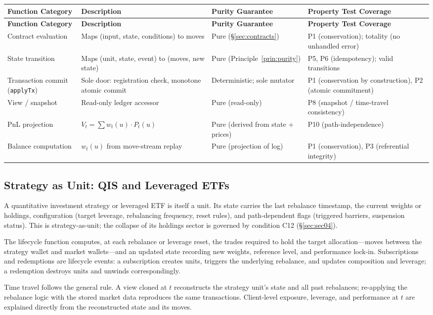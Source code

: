\begin{center}
\begin{longtable}{p{3.2cm} p{4cm} p{2.8cm} p{3.5cm}}
\toprule
\textbf{Function Category} & \textbf{Description} & \textbf{Purity Guarantee} & \textbf{Property Test Coverage} \\
\midrule
\endfirsthead
\toprule
\textbf{Function Category} & \textbf{Description} & \textbf{Purity Guarantee} & \textbf{Property Test Coverage} \\
\midrule
\endhead
Contract evaluation & Maps (input, state, conditions) to moves & Pure (\S\ref{sec:contracts}) & P1 (conservation); totality (no unhandled error) \\
\midrule
State transition & Maps (unit, state, event) to (moves, new state) & Pure (Principle~\ref{prin:purity}) & P5, P6 (idempotency); valid transitions \\
\midrule
Transaction commit (\texttt{applyTx}) & Sole door: registration check, monotone atomic commit & Deterministic; sole mutator & P1 (conservation by construction), P2 (atomic commitment) \\
\midrule
View / snapshot & Read-only ledger accessor & Pure (read-only) & P8 (snapshot / time-travel consistency) \\
\midrule
PnL projection & $V_t = \sum w_t(u) \cdot P_t(u)$ & Pure (derived from state + prices) & P10 (path-independence) \\
\midrule
Balance computation & $w_t(u)$ from move-stream replay & Pure (projection of log) & P1 (conservation), P3 (referential integrity) \\
\bottomrule
\end{longtable}
\end{center}

\subsection{Strategy as Unit: QIS and Leveraged ETFs}

A quantitative investment strategy or leveraged ETF is itself a unit. Its state carries the last rebalance timestamp, the current weights or holdings, configuration (target leverage, rebalancing frequency, reset rules), and path-dependent flags (triggered barriers, suspension status). This is strategy-as-unit; the collapse of its holdings sector is governed by condition C12 (\S\ref{sec:sec04}).

The lifecycle function computes, at each rebalance or leverage reset, the trades required to hold the target allocation---moves between the strategy wallet and market wallets---and an updated state recording new weights, reference level, and performance lock-in. Subscriptions and redemptions are lifecycle events: a subscription creates units, triggers the underlying rebalance, and updates composition and leverage; a redemption destroys units and unwinds correspondingly.

Time travel follows the general rule. A view cloned at $t$ reconstructs the strategy unit's state and all past rebalances; re-applying the rebalance logic with the stored market data reproduces the same transactions. Client-level exposure, leverage, and performance at $t$ are explained directly from the reconstructed state and its moves.
